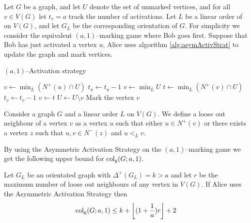 \begin{definition} 
    Let $G$ be a graph, and let $U$ denote the set of unmarked vertices, and for all $v\in V(G)$ let $t_v=a$ track the number of activations. Let $L$ be a linear order of on $V(G)$, and let $G_L$ be the corresponding orientation of $G$. %
    For simplicity we consider the equivalent $(a,1)$--marking game where Bob goes first. Suppose that Bob has just activated a vertex $u$, Alice uses algorithm \ref{alg:asymActivStrat} to update the graph and mark vertices.
    
    \begin{algorithm}[h]
        \caption{$(a,1)$--Activation strategy}
        \label{alg:asymActivStrat}
        \begin{algorithmic}[1]
            \Statex
                    \State $v\gets \min_L (N^+(u)\cap U)$ %
                    \State $t_u \gets t_u-1$
                    \Else 
                    \State $v\gets \min_L U$                  
                \EndIf
                    \State $t\gets \min_L (N^+(v)\cap U)$ %
                    \State $t_v \gets t_v-1$
                    \State $v\gets t$
                \EndWhile
                \State $U \gets U \setminus v$
                \State Mark the vertex $v$
            \EndFor
        \end{algorithmic}
    \end{algorithm}
    
    Consider a graph $G$ and a linear order $L$ on $V(G)$. We define a loose out neighbour of a vertex $v$ as a vertex $u$ such that either $u\in N^+(v)$ or there exists a vertex $z$ such that $u,v\in N^-(z)$ and $u<_L v$. 
    
    By using the Asymmetric Activation Strategy on the $(a,1)$--marking game we get the following upper bound for $\operatorname{col_g}(G;a,1)$.

    \begin{theorem}  %
        Let $G_L$ be an orientated graph with $\Delta^+(G_L)=k>a$ and let $r$ be the maximum number of loose out neighbours of any vertex in $V(G)$. If Alice uses the Asymmetric Activation Strategy then \[\operatorname{col_g}(G;a,1)\leq k+\left\lfloor (1+\frac{1}{a})r \right\rfloor +2\]
    \end{theorem}

\end{definition}



